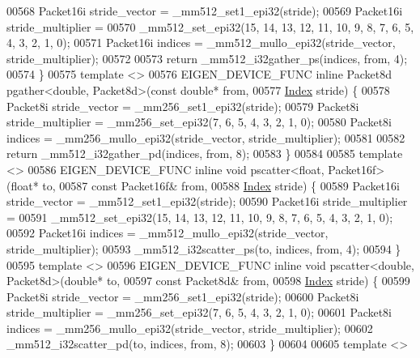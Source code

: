 \begin{DoxyCode}
00568   Packet16i stride\_vector = \_mm512\_set1\_epi32(stride);
00569   Packet16i stride\_multiplier =
00570       \_mm512\_set\_epi32(15, 14, 13, 12, 11, 10, 9, 8, 7, 6, 5, 4, 3, 2, 1, 0);
00571   Packet16i indices = \_mm512\_mullo\_epi32(stride\_vector, stride\_multiplier);
00572 
00573   \textcolor{keywordflow}{return} \_mm512\_i32gather\_ps(indices, from, 4);
00574 \}
00575 \textcolor{keyword}{template} <>
00576 EIGEN\_DEVICE\_FUNC \textcolor{keyword}{inline} Packet8d pgather<double, Packet8d>(\textcolor{keyword}{const} \textcolor{keywordtype}{double}* from,
00577                                                             \hyperlink{namespace_eigen_a62e77e0933482dafde8fe197d9a2cfde}{Index} stride) \{
00578   Packet8i stride\_vector = \_mm256\_set1\_epi32(stride);
00579   Packet8i stride\_multiplier = \_mm256\_set\_epi32(7, 6, 5, 4, 3, 2, 1, 0);
00580   Packet8i indices = \_mm256\_mullo\_epi32(stride\_vector, stride\_multiplier);
00581 
00582   \textcolor{keywordflow}{return} \_mm512\_i32gather\_pd(indices, from, 8);
00583 \}
00584 
00585 \textcolor{keyword}{template} <>
00586 EIGEN\_DEVICE\_FUNC \textcolor{keyword}{inline} \textcolor{keywordtype}{void} pscatter<float, Packet16f>(\textcolor{keywordtype}{float}* to,
00587                                                          \textcolor{keyword}{const} Packet16f& from,
00588                                                          \hyperlink{namespace_eigen_a62e77e0933482dafde8fe197d9a2cfde}{Index} stride) \{
00589   Packet16i stride\_vector = \_mm512\_set1\_epi32(stride);
00590   Packet16i stride\_multiplier =
00591       \_mm512\_set\_epi32(15, 14, 13, 12, 11, 10, 9, 8, 7, 6, 5, 4, 3, 2, 1, 0);
00592   Packet16i indices = \_mm512\_mullo\_epi32(stride\_vector, stride\_multiplier);
00593   \_mm512\_i32scatter\_ps(to, indices, from, 4);
00594 \}
00595 \textcolor{keyword}{template} <>
00596 EIGEN\_DEVICE\_FUNC \textcolor{keyword}{inline} \textcolor{keywordtype}{void} pscatter<double, Packet8d>(\textcolor{keywordtype}{double}* to,
00597                                                          \textcolor{keyword}{const} Packet8d& from,
00598                                                          \hyperlink{namespace_eigen_a62e77e0933482dafde8fe197d9a2cfde}{Index} stride) \{
00599   Packet8i stride\_vector = \_mm256\_set1\_epi32(stride);
00600   Packet8i stride\_multiplier = \_mm256\_set\_epi32(7, 6, 5, 4, 3, 2, 1, 0);
00601   Packet8i indices = \_mm256\_mullo\_epi32(stride\_vector, stride\_multiplier);
00602   \_mm512\_i32scatter\_pd(to, indices, from, 8);
00603 \}
00604 
00605 \textcolor{keyword}{template} <>

\end{DoxyCode}
